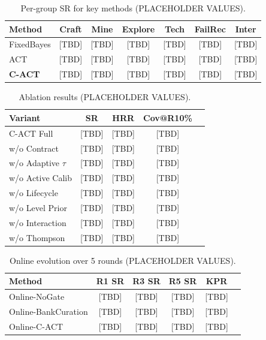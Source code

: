 \documentclass[letterpaper]{article}
\begin{document}
\begin{table}[t]
\centering
\caption{Per-group SR for key methods (PLACEHOLDER VALUES).}
\label{tab:bygroup}
\begin{tabular}{lcccccc}
\toprule
\textbf{Method} & \textbf{Craft} & \textbf{Mine} & \textbf{Explore} & \textbf{Tech} & \textbf{FailRec} & \textbf{Inter} \\
\midrule
FixedBayes      & [TBD] & [TBD] & [TBD] & [TBD] & [TBD] & [TBD] \\
ACT             & [TBD] & [TBD] & [TBD] & [TBD] & [TBD] & [TBD] \\
\textbf{C-ACT}  & [TBD] & [TBD] & [TBD] & [TBD] & [TBD] & [TBD] \\
\bottomrule
\end{tabular}
\end{table}

\begin{table}[t]
\centering
\caption{Ablation results (PLACEHOLDER VALUES).}
\label{tab:ablation}
\begin{tabular}{lcccc}
\toprule
\textbf{Variant} & \textbf{SR} & \textbf{HRR} & \textbf{Cov@R10\%} \\
\midrule
C-ACT Full          & [TBD] & [TBD] & [TBD] \\
w/o Contract        & [TBD] & [TBD] & [TBD] \\
w/o Adaptive $\tau$ & [TBD] & [TBD] & [TBD] \\
w/o Active Calib    & [TBD] & [TBD] & [TBD] \\
w/o Lifecycle       & [TBD] & [TBD] & [TBD] \\
w/o Level Prior     & [TBD] & [TBD] & [TBD] \\
w/o Interaction     & [TBD] & [TBD] & [TBD] \\
w/o Thompson        & [TBD] & [TBD] & [TBD] \\
\bottomrule
\end{tabular}
\end{table}

\begin{table}[t]
\centering
\caption{Online evolution over 5 rounds (PLACEHOLDER VALUES).}
\label{tab:online}
\begin{tabular}{lccccc}
\toprule
\textbf{Method} & \textbf{R1 SR} & \textbf{R3 SR} & \textbf{R5 SR} & \textbf{KPR} \\
\midrule
Online-NoGate       & [TBD] & [TBD] & [TBD] & [TBD] \\
Online-BankCuration & [TBD] & [TBD] & [TBD] & [TBD] \\
Online-C-ACT        & [TBD] & [TBD] & [TBD] & [TBD] \\
\bottomrule
\end{tabular}
\end{table}
\end{document}

